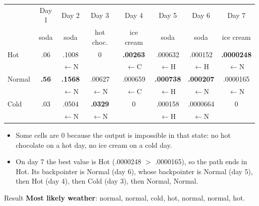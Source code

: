 \begin{center}
\footnotesize
\setlength{\tabcolsep}{4pt}
\begin{tabular}{@{}l ccccccc@{}}
\toprule
 & Day 1 & Day 2 & Day 3 & Day 4 & Day 5 & Day 6 & Day 7 \\
 & soda & soda & hot choc. & ice cream & soda & soda & ice cream \\
\midrule
Hot    & .06 & .1008 & 0 & \cellcolor{nbteal!25}\textbf{.00263} & .000632 & .000152 & \cellcolor{nbteal!25}\textbf{.0000248} \\
       & & {\scriptsize$\leftarrow$N} & & {\scriptsize$\leftarrow$C} & {\scriptsize$\leftarrow$H} & {\scriptsize$\leftarrow$H} & {\scriptsize$\leftarrow$N} \\
Normal & \cellcolor{nbteal!25}\textbf{.56} & \cellcolor{nbteal!25}\textbf{.1568} & .00627 & .000659 & \cellcolor{nbteal!25}\textbf{.000738} & \cellcolor{nbteal!25}\textbf{.000207} & .0000165 \\
       & & {\scriptsize$\leftarrow$N} & {\scriptsize$\leftarrow$N} & {\scriptsize$\leftarrow$C} & {\scriptsize$\leftarrow$H} & {\scriptsize$\leftarrow$N} & {\scriptsize$\leftarrow$N} \\
Cold   & .03 & .0504 & \cellcolor{nbteal!25}\textbf{.0329} & 0 & .000158 & .0000664 & 0 \\
       & & {\scriptsize$\leftarrow$N} & {\scriptsize$\leftarrow$N} & & {\scriptsize$\leftarrow$H} & {\scriptsize$\leftarrow$N} & \\
\bottomrule
\end{tabular}
\end{center}

\begin{itemize}[nosep]
  \item Some cells are 0 because the output is impossible in that state: no hot
        chocolate on a hot day, no ice cream on a cold day.
  \item On day 7 the best value is Hot (.0000248 $>$ .0000165), so the path ends in Hot.
        Its backpointer is Normal (day 6), whose backpointer is Normal (day 5), then Hot
        (day 4), then Cold (day 3), then Normal, Normal.
\end{itemize}

\begin{nbfact}{Result}
\textbf{Most likely weather}: normal, normal, cold, hot, normal, normal, hot.
\end{nbfact}

